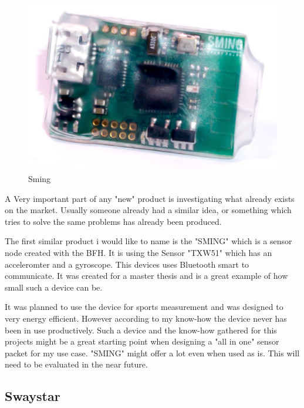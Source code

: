 \begin{figure}
  \begin{center}
\includegraphics[width=\linewidth]{images/sming_pic2.jpg}
  \end{center}
  \caption{\label{fig:Sming}Sming \cite{sming:book}}
\end{figure}
A Very important part of any "new" product is investigating what already exists on the market.
Usually someone already had a similar idea, or something which tries to solve the same problems has already been produced. 

The first similar product i would like to name is the "SMING" which is a sensor node created with the BFH. 
It is using the Sensor "TXW51" which has an acceleromter and a gyroscope. This devices uses Bluetooth smart to communicate. It was created for a master thesis and is a great example of how small such a device can be. 

It was planned to use the device for sports measurement and was designed to very energy efficient. However according to my know-how the device never has been in use productively. \cite{sming:book}
Such a device and the know-how gathered for this projects might be a great starting point when designing a "all in one" sensor packet for my use case. "SMING" might offer a lot even when used as is. This will need to be evaluated in the near future.

\subsection{Swaystar}

